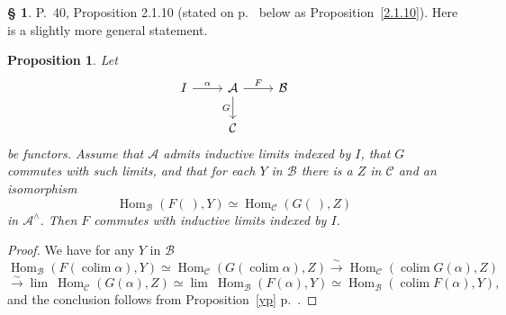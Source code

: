\documentclass[12pt]{article}%
\newtheorem{prop}[thm]{Proposition}
\theoremstyle{remark}
\theoremstyle{definition}
\newtheorem{s}[thm]{\S}%
\newcommand{\A}{\mathcal A}
\newcommand{\B}{\mathcal B}
\newcommand{\C}{\mathcal C}
\newcommand{\xr}{\xrightarrow}
\DeclareMathOperator*{\colim}{colim}%
\DeclareMathOperator{\Hom}{Hom}%
\begin{document}
%

\begin{s} 
P.~40, Proposition 2.1.10 (stated on p.~\pageref{2.1.10} below as Proposition~\ref{2.1.10}). Here is a slightly more general statement. 
%
\begin{prop}\label{2.1.10b}
Let 
$$
\begin{tikzcd}
I\ar{r}{\alpha}&\A\ar{d}[swap]{G}\ar{r}{F}&\B\\
&\C
\end{tikzcd}
$$
be functors. Assume that $\A$ admits inductive limits indexed by $I$, that $G$ commutes with such limits, and that for each $Y$ in $\B$ there is a $Z$ in $\C$ and an isomorphism 
$$
\Hom_\B(F(\ ),Y)\simeq\Hom_\C(G(\ ),Z)
$$
in $\A^\wedge$. Then $F$ commutes with inductive limits indexed by $I$.
\end{prop}
%
\begin{proof}
We have for any $Y$ in $\B$ 
$$ 
\Hom_\B\left(F\left(\colim\alpha\right),Y\right)\simeq
\Hom_\C\left(G\left(\colim\alpha\right),Z\right)
\xr\sim
\Hom_\C\left(\colim G(\alpha),Z\right)
$$
$$
\xr\sim\lim \ \Hom_\C(G(\alpha),Z)\simeq\lim \ \Hom_\B(F(\alpha),Y)\simeq\Hom_\B(\colim F(\alpha),Y),
$$ 
and the conclusion follows from Proposition~\ref{yp} p.~\pageref{yp}.
\end{proof}
\end{s}

%
\end{document}
